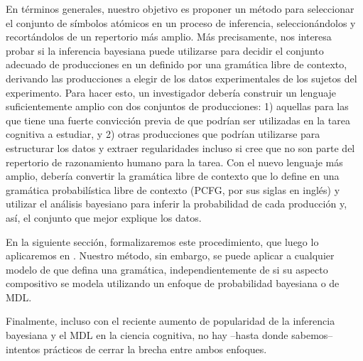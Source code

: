 En términos generales, nuestro objetivo es proponer un método para seleccionar el conjunto de símbolos atómicos en un proceso de inferencia, seleccionándolos y recortándolos de un repertorio más amplio. Más precisamente, nos interesa probar si la inferencia bayesiana puede utilizarse para decidir el conjunto adecuado de producciones en un \lot definido por una gramática libre de contexto, derivando las producciones a elegir de los datos experimentales de los sujetos del experimento. Para hacer esto, un investigador debería construir un lenguaje suficientemente amplio con dos conjuntos de producciones: 1) aquellas para las que tiene una fuerte convicción previa de que podrían ser utilizadas en la tarea cognitiva a estudiar, y 2) otras producciones que podrían utilizarse para estructurar los datos y extraer regularidades incluso si cree que no son parte del repertorio de razonamiento humano para la tarea. Con el nuevo lenguaje más amplio, debería convertir la gramática libre de contexto que lo define en una gramática probabilística libre de contexto (PCFG, por sus siglas en inglés) y utilizar el análisis bayesiano para inferir la probabilidad de cada producción y, así, el conjunto que mejor explique los datos.


En la siguiente sección, formalizaremos este procedimiento, que luego lo aplicaremos en \gramgeo. Nuestro método, sin embargo, se puede aplicar a cualquier modelo de \lot que defina una gramática, independientemente de si su aspecto compositivo se modela utilizando un enfoque de probabilidad bayesiana o de MDL.


Finalmente, incluso con el reciente aumento de popularidad de la inferencia bayesiana y el MDL en la ciencia cognitiva, no hay --hasta donde sabemos-- intentos prácticos de cerrar la brecha entre ambos enfoques.

